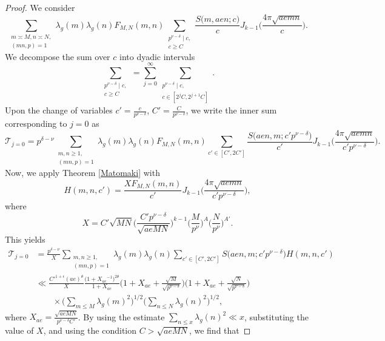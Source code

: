 \documentclass[12pt]{amsart}
\theoremstyle{plain}
\theoremstyle{definition}
\begin{document}
\begin{proof}
We consider 
    \[
    \sum_{\substack{ m\asymp M, n\asymp N, \\
    (mn, p)=1}}
    \lambda_g(m) \lambda_g(n)
    F_{M, N}(m, n)
    \sum_{\substack{p^{\nu-\delta} \mid c,\\ c\geq C}}
    \frac{S\big(m, aen; c\big)}{c} 
    J_{k-1}\Big(\frac{4\pi\sqrt{aemn}}{c}\Big).
    \]
 We decompose the sum over $c$ into dyadic intervals
    \[
    \sum_{\substack{p^{\nu-\delta} \mid c,\\ c\geq C}}
    = \sum_{j=0}^\infty \sum_{\substack{p^{\nu-\delta} \mid c,\\ c\in [2^jC, 2^{j+1}C]}}.
    \]
Upon the change of variables $c'=\frac{c}{p^{\nu-\delta}}$, $C'=\frac{C}{p^{\nu-\delta}}$, we write the inner sum corresponding to $j=0$  as
    \[
    \mathcal{T}_{j=0}
    =
    p^{\delta-\nu}
    \sum_{\substack{m, n \geq 1, \\
    (mn, p)=1}}
    \lambda_g(m) \lambda_g(n)
    F_{M, N}(m, n)
    \sum_{c' \in [C', 2C']}
    \frac{S\big(aen, m; c' p^{\nu-\delta}\big)}{c'} 
    J_{k-1}\Big(\frac{4\pi\sqrt{aemn}}{c' p^{\nu-\delta}}\Big). 
    \]
Now, we apply Theorem \ref{Matomaki} with
    \[
    H(m, n, c')
    = \frac{XF_{M, N}(m, n)}{c'}
    J_{k-1}\Big(\frac{4\pi\sqrt{aemn}}{c' p^{\nu-\delta}}\Big),
    \]
where
    \[
    X=  C'  \sqrt{MN} \bigg(\frac{C' p^{\nu-\delta}}{\sqrt{aeMN}}\bigg)^{k-1} 
    \Big(\frac{M}{p^\nu}\Big)^A
    \Big(\frac{N}{p^\nu}\Big)^{A'}.
    \]
This yields
    \begin{align*}
    \mathcal{T}_{j=0}
    &=  \frac{p^{\delta-\nu}}{X}
    \sum_{\substack{m, n \geq 1, \\
    (mn, p)=1}}
    \lambda_g(m) \lambda_g(n)
    \sum_{c' \in [C', 2C']}
    S\big(aen, m; c' p^{\nu-\delta}\big)  H(m, n, c')\\&
    \ll
     \frac{{C'}^{1+\epsilon} (ae)^{\theta}}{X} 
    \frac{\big(1+{X_{ae}}^{-1}\big)^{2\theta}}{1+X_{ae}}
    \Big(1+X_{ae}+\frac{\sqrt{M}}{\sqrt{p^{\nu-\delta}}}\Big)
    \Big(1+X_{ae}+\frac{\sqrt{N}}{\sqrt{p^{\nu-\delta}}}\Big)
    \\
    &\hspace{2em} \times \Big( \sum_{m\leq M} \lambda_g(m)^2\Big)^{1/2}
    \Big( \sum_{n\leq N} \lambda_g(n)^2\Big)^{1/2},
    \end{align*}
    where $X_{ae}=\frac{\sqrt{aeMN}}{p^{\nu-\delta}C'}$. By using the estimate $ \sum_{n\leq x} \lambda_g(n)^2 \ll x$, substituting the value of $X$, and using the condition $C>\sqrt{aeMN}$, we find that 

\end{proof}
\end{document}
